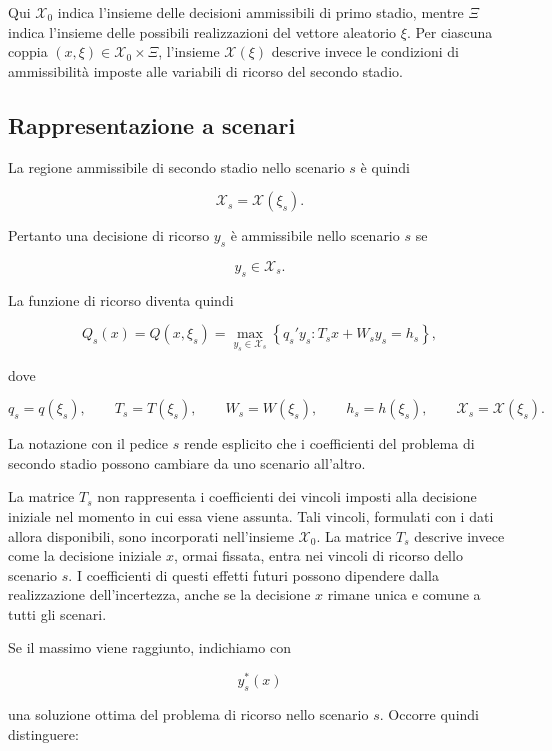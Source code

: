 Qui $\mathcal X_0$ indica l'insieme delle decisioni ammissibili di primo
stadio, mentre $\Xi$ indica l'insieme delle possibili realizzazioni del
vettore aleatorio $\xi$. Per ciascuna coppia
$(x,\xi)\in\mathcal X_0\times\Xi$, l'insieme $\mathcal X(\xi)$ descrive
invece le condizioni di ammissibilit\`a imposte alle variabili di ricorso
del secondo stadio.

\subsection{Rappresentazione a scenari}

La regione ammissibile di secondo stadio nello scenario $s$ \`e quindi

\[
\mathcal X_s
=
\mathcal X(\xi_s).
\]

Pertanto una decisione di ricorso $y_s$ \`e ammissibile nello scenario
$s$ se

\[
y_s\in\mathcal X_s.
\]

La funzione di ricorso diventa quindi

\begin{equation}
Q_s(x)
=
Q(x,\xi_s)
=
\max_{y_s\in\mathcal X_s}
\left\{
q_s'y_s:
T_sx+W_sy_s=h_s
\right\},
\label{eq:cap14-ricorso-scenario}
\end{equation}

dove

\[
q_s=q(\xi_s),
\qquad
T_s=T(\xi_s),
\qquad
W_s=W(\xi_s),
\qquad
h_s=h(\xi_s),
\qquad
\mathcal X_s=\mathcal X(\xi_s).
\]

La notazione con il pedice $s$ rende esplicito che i coefficienti del
problema di secondo stadio possono cambiare da uno scenario all'altro.

La matrice $T_s$ non rappresenta i coefficienti dei vincoli imposti
alla decisione iniziale nel momento in cui essa viene assunta. Tali
vincoli, formulati con i dati allora disponibili, sono incorporati
nell'insieme $\mathcal X_0$. La matrice $T_s$ descrive invece come la
decisione iniziale $x$, ormai fissata, entra nei vincoli di ricorso
dello scenario $s$. I coefficienti di questi effetti futuri possono
dipendere dalla realizzazione dell'incertezza, anche se la decisione
$x$ rimane unica e comune a tutti gli scenari.

Se il massimo viene raggiunto, indichiamo con

\[
y_s^*(x)
\]

\noindent una soluzione ottima del problema di ricorso nello scenario $s$.
Occorre quindi distinguere:

